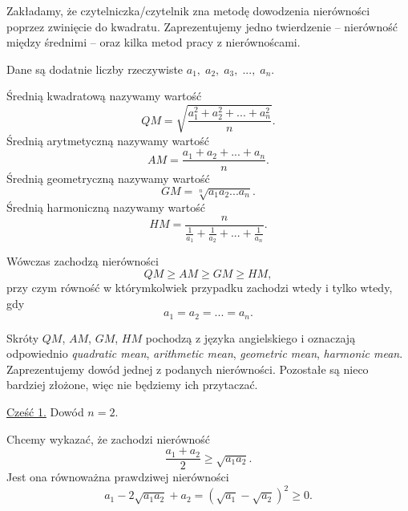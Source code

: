 

\noindent
Zakładamy, że czytelniczka/czytelnik zna metodę dowodzenia nierówności poprzez zwinięcie do kwadratu. Zaprezentujemy jedno twierdzenie -- nierówność między średnimi -- oraz kilka metod pracy z nierównoścami.

\vspace{10px}


\noindent
Dane są dodatnie liczby rzeczywiste $a_1,\; a_2, \; a_3, \; ..., \; a_n$.

\noindent
Średnią kwadratową nazywamy wartość
\[
    QM = \sqrt{\frac{a_1^2 + a_2^2 + ... + a_n^2}{n}}.
\]
Średnią arytmetyczną nazywamy wartość
\[
    AM = \frac{a_1 + a_2 + ... + a_n}{n}.
\]
Średnią geometryczną nazywamy wartość
\[
    GM = \sqrt[n]{a_1a_2...a_n}.
\]
Średnią harmoniczną nazywamy wartość
\[
   HM = \frac{n}{\frac{1}{a_1} + \frac{1}{a_2} + ... + \frac{1}{a_n}}.
\]

\noindent
Wówczas zachodzą nierówności
\[
    QM \geqslant AM \geqslant GM \geqslant HM,
\]
przy czym równość w którymkolwiek przypadku zachodzi wtedy i tylko wtedy, gdy
\[
    a_1 = a_2 = ... = a_n.
\]

\vspace{10px}
\noindent
Skróty $QM$, $AM$, $GM$, $HM$ pochodzą z języka angielskiego i oznaczają odpowiednio \textit{quadratic mean}, \textit{arithmetic mean}, \textit{geometric mean}, \textit{harmonic mean}. Zaprezentujemy dowód jednej z podanych nierówności. Pozostałe są nieco bardziej złożone, więc nie będziemy ich przytaczać.

\vspace{10px}


\noindent
\underline{Cześć 1.} Dowód $n = 2$.

\vspace{10px}

\noindent
Chcemy wykazać, że zachodzi nierówność
\[
    \frac{a_1 + a_2}{2} \geqslant \sqrt{a_1a_2}.
\]
Jest ona równoważna prawdziwej nierówności
\[
    a_1 - 2\sqrt{a_1a_2} + a_2 = (\sqrt{a_1} - \sqrt{a_2})^2 \geqslant 0.
\]

